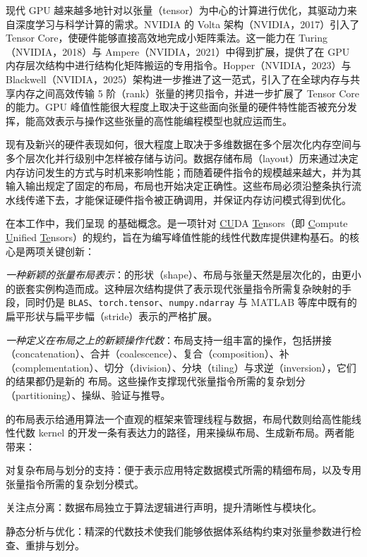 
现代 GPU 越来越多地针对以张量（tensor）为中心的计算进行优化，其驱动力来自深度学习与科学计算的需求。NVIDIA 的 Volta 架构（NVIDIA，2017）引入了 Tensor Core，使硬件能够直接高效地完成小矩阵乘法。这一能力在 Turing（NVIDIA，2018）与 Ampere（NVIDIA，2021）中得到扩展，提供了在 GPU 内存层次结构中进行结构化矩阵搬运的专用指令。Hopper（NVIDIA，2023）与 Blackwell（NVIDIA，2025）架构进一步推进了这一范式，引入了在全球内存与共享内存之间高效传输 5 阶（rank）张量的拷贝指令，并进一步扩展了 Tensor Core 的能力。GPU 峰值性能很大程度上取决于这些面向张量的硬件特性能否被充分发挥，能高效表示与操作这些张量的高性能编程模型也就应运而生。

现有及新兴的硬件表现如何，很大程度上取决于多维数据在多个层次化内存空间与多个层次化并行级别中怎样被存储与访问。数据存储布局（layout）历来通过决定内存访问发生的方式与时机来影响性能；而随着硬件指令的规模越来越大，并为其输入输出规定了固定的布局，布局也开始决定正确性。这些布局必须沿整条执行流水线传递下去，才能保证硬件指令被正确调用，并保证内存访问模式得到优化。

在本工作中，我们呈现 \CuTe 的基础概念。\CuTe 是一项针对 \underline{CU}DA \underline{Te}nsors（即 \underline{C}ompute \underline{U}nified \underline{Te}nsors）的规约，旨在为编写峰值性能的线性代数库提供建构基石。\CuTe 的核心是两项关键创新：
\begin{compactitem}
\item {\em 一种新颖的张量布局表示}：\CuTe 的形状（shape）、布局与张量天然是层次化的，由更小的嵌套实例构造而成。这种层次结构提供了表示现代张量指令所需复杂映射的手段，同时仍是 {\tt BLAS}、{\tt torch.tensor}、{\tt numpy.ndarray} 与 MATLAB 等库中既有的扁平形状与扁平步幅（stride）表示的严格扩展。
\item {\em 一种定义在布局之上的新颖操作代数}：\CuTe 布局支持一组丰富的操作，包括拼接（concatenation）、合并（coalescence）、复合（composition）、补（complementation）、切分（division）、分块（tiling）与求逆（inversion），它们的结果都仍是新的 \CuTe 布局。这些操作支撑现代张量指令所需的复杂划分（partitioning）、操纵、验证与推导。
\end{compactitem}

\CuTe 的布局表示给通用算法一个直观的框架来管理线程与数据，布局代数则给高性能线性代数 kernel 的开发一条有表达力的路径，用来操纵布局、生成新布局。两者能带来：
\begin{compactitem}
\item 对复杂布局与划分的支持：\CuTe 便于表示应用特定数据模式所需的精细布局，以及专用张量指令所需的复杂划分模式。
\item 关注点分离：数据布局独立于算法逻辑进行声明，提升清晰性与模块化。
\item 静态分析与优化：精深的代数技术使我们能够依据体系结构约束对张量参数进行检查、重排与划分。
\end{compactitem}

